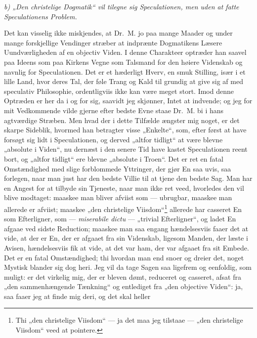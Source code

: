 \begin{center}
\emph{b) „Den christelige Dogmatik“ vil tilegne sig Speculationen,
men uden at fatte Speculationens Problem.}
\end{center}

Det kan visselig ikke miskjendes, at Dr.\ M. jo paa mange Maader
og under mange forskjellige Vendinger stræber at indprænte
Dogmatikens Læsere Uundværligheden af en objectiv Viden. I denne
Charakteer optræder han saavel paa Ideens som paa Kirkens Vegne
som Talsmand for den høiere Videnskab og navnlig for
 Speculationen. Det er et hæderligt Hverv, en smuk Stilling, især i
et lille Land, hvor deres Tal, der føle Trang og Kald til grundig
at give sig af med speculativ Philosophie, ordentligviis ikke kan
være meget stort. Imod denne Optræden er her da i og for sig,
saavidt jeg skjønner, Intet at indvende; og jeg for mit
Vedkommende vilde gjerne efter bedste Evne staae Dr.\ M. bi i hans
agtværdige Stræben. Men hvad der i dette Tilfælde ængster mig
noget, er det skarpe Sideblik, hvormed han betragter visse
„Enkelte“, som, efter først at have forsøgt sig lidt i
Speculationen, og derved „altfor tidligt“ at være blevne „absolute
i Viden“, nu dernæst i den senere Tid have kastet Speculationen
reent bort, og „altfor tidligt“ ere blevne „absolute i Troen“. Det
er ret en fatal Omstændighed med slige forblommede Yttringer, der
gjør En saa uvis, saa forlegen, naar man just har den bedste
Villie til at tjene den bedste Sag. Man har en Angest for at
tilbyde sin Tjeneste, naar man ikke ret veed, hvorledes den vil
blive modtaget: maaskee man bliver afviist som --- ubrugbar,
maaskee man allerede er afviist; maaskee „den christelige
Viisdom“\footnote{Thi „den christelige Viisdom“ --- ja det maa jeg
tilstaae --- „den christelige Viisdom“ veed at pointere.} allerede
har casseret En som Efterligner, som --- \textit{miserabile dictu}
--- „trivial Efterligner“, og ladet En afgaae ved sidste
Reduction; maaskee man saa engang hændelsesviis faaer det at vide,
at der er
 En, der er afgaaet fra sin Videnskab, ligesom Manden, der læste i
Avisen, hændelsesviis fik at vide, at det var ham, der var afgaaet
fra sit Embede. Det er en fatal Omstændighed; thi hvordan man end
snoer og dreier det, noget Mystisk blander sig dog heri. Jeg vil
da tage Sagen saa ligefrem og eenfoldig, som muligt: er det
virkelig mig, der er bleven dømt, reduceret og casseret, afsat fra
„den sammenhængende Tænkning“ og entlediget fra „den objective
Viden“: ja, saa faaer jeg at finde mig deri, og det skal heller
